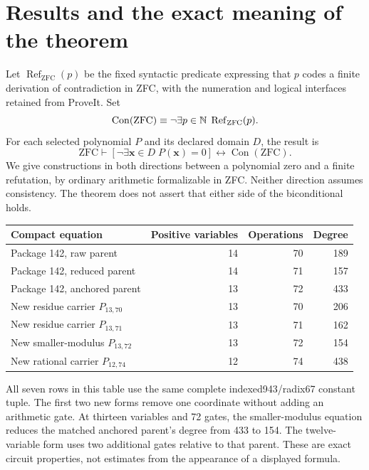 \documentclass[11pt]{article}
\theoremstyle{remark}\newtheorem{remark}[theorem]{Remark}
\newcommand{\Con}{\operatorname{Con}}\newcommand{\lcm}{\operatorname{lcm}}
\newcommand{\Refutes}{\operatorname{Ref}}
\begin{document}
\section{Results and the exact meaning of the theorem}

Let $\Refutes_{\mathrm{ZFC}}(p)$ be the fixed syntactic predicate expressing
that $p$ codes a finite derivation of contradiction in ZFC, with the
numeration and logical interfaces retained from ProveIt. Set
\[
 \Con(\mathrm{ZFC})\equiv
 \neg\exists p\in\N\;\Refutes_{\mathrm{ZFC}}(p).
\]
For each selected polynomial $P$ and its declared domain $D$, the result is
\begin{equation}\label{eq:target}
 \mathrm{ZFC}\vdash
 \left[\neg\exists\mathbf x\in D\;P(\mathbf x)=0\right]
 \longleftrightarrow\Con(\mathrm{ZFC}).
\end{equation}
We give constructions in both directions between a polynomial zero and
a finite refutation, by ordinary arithmetic formalizable in ZFC.
Neither direction assumes consistency. The theorem does not assert
that either side of the biconditional holds.

\begin{center}\small
\begin{tabular}{@{}lrrr@{}}
\toprule
Compact equation & Positive variables & Operations & Degree\\
\midrule
Package 142, raw parent &14&70&189\\
Package 142, reduced parent &14&71&157\\
Package 142, anchored parent &13&72&433\\
\midrule
New residue carrier $P_{13,70}$ &13&70&206\\
New residue carrier $P_{13,71}$ &13&71&162\\
New smaller-modulus $P_{13,72}$ &13&72&154\\
New rational carrier $P_{12,74}$ &12&74&438\\
\bottomrule
\end{tabular}
\end{center}
All seven rows in this table use the same complete indexed943/radix67
constant tuple. The first two new forms remove one coordinate without
adding an arithmetic gate. At thirteen variables and 72 gates, the
smaller-modulus equation reduces the matched anchored parent's degree
from 433 to 154. The twelve-variable form uses two additional gates
relative to that parent. These are exact circuit properties, not
estimates from the appearance of a displayed formula.
\end{document}

